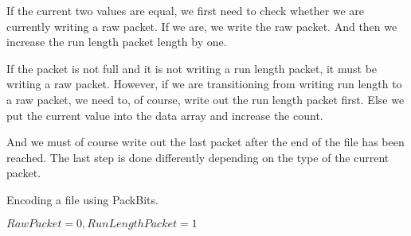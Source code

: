 \begin{refsection}
If the current two values are equal, we first need to check whether we
are currently writing a raw packet. If we are, we write the raw
packet. And then we increase the run length packet length by one.

If the packet is not full and it is not writing a run length packet,
it must be writing a raw packet. However, if we are transitioning from
writing run length to a raw packet, we need to, of course, write out
the run length packet first. Else we put the current value into the
data array and increase the count.

And we must of course write out the last packet after the end of the
file has been reached. The last step is done differently depending on
the type of the current packet. 

\begin{algorithm}[h]
  \caption{Encoding a file using PackBits.}
  \label{alg:packbits-enc}
  \begin{algorithmic}[1]
    \Require $RawPacket = 0,RunLengthPacket = 1$


    \While{\neof}


            \State {}

          \Else

            \State {}

          \EndIf

            \State {}
          \EndIf


        \Else


            \State {}


\end{algorithmic}
\end{algorithm}
\end{refsection}
